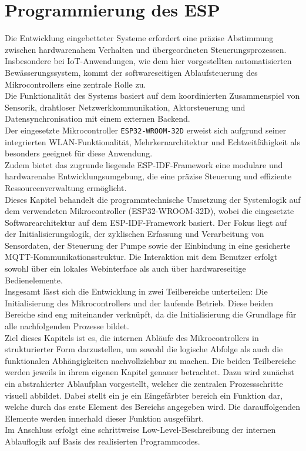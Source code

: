 \section{Programmierung des ESP}
\label{mculogik}

Die Entwicklung eingebetteter Systeme erfordert eine präzise Abstimmung zwischen hardwarenahem Verhalten und übergeordneten Steuerungsprozessen. Insbesondere bei IoT-An\-wen\-dun\-gen, wie dem hier vorgestellten automatisierten Bewässerungssystem, kommt der softwareseitigen Ablaufsteuerung des Mikrocontrollers eine zentrale Rolle zu. 
\\
Die Funktionalität des Systems basiert auf dem koordinierten Zusammenspiel von Sensorik, drahtloser Netzwerkkommunikation, Aktorsteuerung und Datensynchronisation mit einem externen Backend.
\\
Der eingesetzte Mikrocontroller \texttt{ESP32-WROOM-32D} erweist sich aufgrund seiner integrierten WLAN-Funktionalität, Mehrkernarchitektur und Echtzeitfähigkeit als besonders geeignet für diese Anwendung. 
\\
Zudem bietet das zugrunde liegende ESP-IDF-Framework eine modulare und hardwarenahe Entwicklungsumgebung, die eine präzise Steuerung und effiziente Ressourcenverwaltung ermöglicht.
\\
Dieses Kapitel behandelt die programmtechnische Umsetzung der Systemlogik auf dem verwendeten Mikrocontroller (ESP32-WROOM-32D), wobei die eingesetzte Softwarearchitektur auf dem ESP-IDF-Framework basiert. Der Fokus liegt auf der Initialisierungslogik, der zyklischen Erfassung und Verarbeitung von Sensordaten, der Steuerung der Pumpe sowie der Einbindung in eine gesicherte MQTT-Kommunikationsstruktur. Die Interaktion mit dem Benutzer erfolgt sowohl über ein lokales Webinterface als auch über hardwareseitige Bedienelemente. 
\\
Insgesamt lässt sich die Entwicklung in zwei Teilbereiche unterteilen: Die Initialisierung des Mikrocontrollers und der laufende Betrieb. Diese beiden Bereiche sind eng miteinander verknüpft, da die Initialisierung die Grundlage für alle nachfolgenden Prozesse bildet.
\\
Ziel dieses Kapitels ist es, die internen Abläufe des Mikrocontrollers in strukturierter Form darzustellen, um sowohl die logische Abfolge als auch die funktionalen Abhängigkeiten nachvollziehbar zu machen. Die beiden Teilbereiche werden jeweils in ihrem eigenen Kapitel genauer betrachtet. Dazu wird zunächst ein abstrahierter Ablaufplan vorgestellt, welcher die zentralen Prozessschritte visuell abbildet. Dabei stellt ein je ein Eingefärbter bereich ein Funktion dar, welche durch das erste Element des Bereichs angegeben wird. Die darauffolgenden Elemente werden innerhald dieser Funktion ausgeführt. 
\\
Im Anschluss erfolgt eine schrittweise Low-Level-Beschreibung der internen Ablauflogik auf Basis des realisierten Programmcodes.
\\

